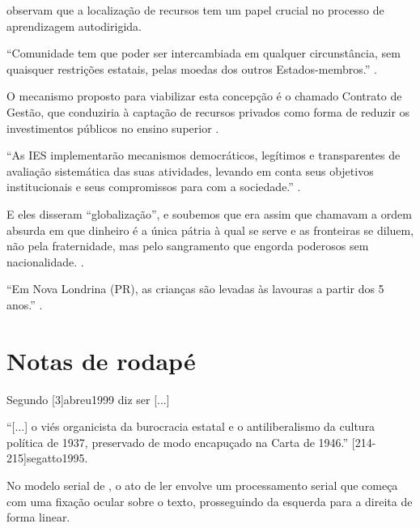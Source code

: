 \documentclass[a4paper]{article}
\begin{document}
\textcite{merriam1991} observam que a localização de recursos tem um papel
crucial no processo de aprendizagem autodirigida.

“Comunidade tem que poder ser intercambiada em qualquer circunstância, sem
quaisquer restrições estatais, pelas moedas dos outros Estados-membros.”
\cite[34]{comissao1992}.

O mecanismo proposto para viabilizar esta concepção é o chamado Contrato de
Gestão, que conduziria à captação de recursos privados como forma de reduzir
os investimentos públicos no ensino superior \cite{brasil1995}.

“As IES implementarão mecanismos democráticos, legítimos e transparentes de
avaliação sistemática das suas atividades, levando em conta seus objetivos
institucionais e seus compromissos para com a sociedade.”
\cite[55]{anteprojeto1987}.

E eles disseram “globalização”, e soubemos que era assim que chamavam a ordem
absurda em que dinheiro é a única pátria à qual se serve e as fronteiras se
diluem, não pela fraternidade, mas pelo sangramento que engorda poderosos sem
nacionalidade. \cite[4]{aflor1995}.

“Em Nova Londrina (PR), as crianças são levadas às lavouras a partir dos
5 anos.” \cite[12]{noscanaviais1995}.


\section{Notas de rodapé}

Segundo [3]{abreu1999} diz ser [...]

“[...] o viés organicista da burocracia estatal e o antiliberalismo da cultura
política de 1937, preservado de modo encapuçado na Carta de 1946.”
[214-215]{segatto1995}.

No modelo serial de , o ato de ler envolve um
processamento serial que começa com uma fixação ocular sobre o texto,
prosseguindo da esquerda para a direita de forma linear.
\end{document}
